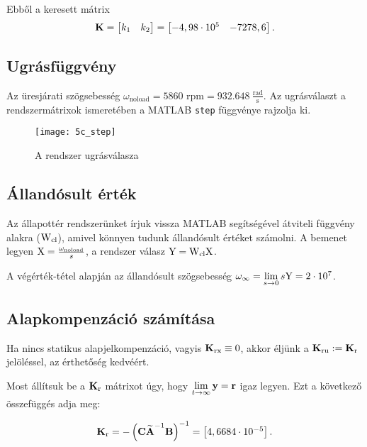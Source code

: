 Ebből a keresett mátrix
\begin{equation}
	\boldsymbol{\mathrm{K}} = \begin{bmatrix}k_1&k_2\end{bmatrix} = \begin{bmatrix}-4,98\cdot10^5& -7278,6\end{bmatrix}.
\end{equation}


\subsection{Ugrásfüggvény}

Az üresjárati szögsebesség $\omega_\text{noload} = 5860\text{ rpm} = 932.648~\frac{\text{rad}}{\text{s}}$. Az ugrásválaszt a rendszermátrixok ismeretében a MATLAB \verb|step| függvénye rajzolja ki.

\begin{figure}[H]
	\centering
	\texttt{[image: 5c\_step]}
	\caption{A rendszer ugrásválasza}
	\label{fig:5c_step}
\end{figure}



\subsection{Állandósult érték}\label{subsec:5d}

Az állapottér rendszerünket írjuk vissza MATLAB segítségével átviteli függvény
alakra ($\mathrm{W}_\text{cl}$), amivel könnyen tudunk állandósult értéket számolni.
A bemenet legyen $\mathrm{X} = \frac{\omega_\text{noload}}{s}$, a rendszer válasz $\mathrm{Y} = \mathrm{W}_\text{cl}\mathrm{X}$.

A végérték-tétel alapján az állandósult szögsebesség $\omega_\infty = \lim\limits_{s\rightarrow 0}s\mathrm{Y} = 2\cdot10^7$.%


\subsection{Alapkompenzáció számítása}

Ha nincs statikus alapjelkompenzáció, vagyis $\boldsymbol{\mathrm{K}}_\text{rx}\equiv0$, akkor éljünk
a $\boldsymbol{\mathrm{K}}_\text{ru}:=\boldsymbol{\mathrm{K}}_\text{r}$ jelöléssel, az érthetőség kedvéért.

Most állítsuk be a $\boldsymbol{\mathrm{K}}_\text{r}$ mátrixot úgy, hogy
$\lim\limits_{t\rightarrow\infty}\boldsymbol{\mathrm{y}}=\boldsymbol{\mathrm{r}}$ igaz legyen.
Ezt a következő összefüggés adja meg:

\begin{equation}
	\boldsymbol{\mathrm{K}}_\text{r} = -\left(\boldsymbol{\mathrm{C}}\widetilde{\boldsymbol{\mathrm{A}}}^{-1}\boldsymbol{\mathrm{B}}\right)^{-1} = \begin{bmatrix}4,6684\cdot10^{-5}\end{bmatrix}.
\end{equation}

